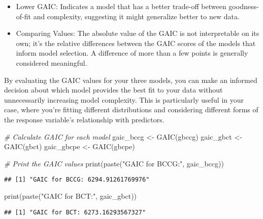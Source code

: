 \documentclass[
]{article}
\newenvironment{Shaded}{\begin{snugshade}}{\end{snugshade}}
\newcommand{\CommentTok}[1]{\textcolor[rgb]{0.56,0.35,0.01}{\textit{#1}}}
\newcommand{\FunctionTok}[1]{\textcolor[rgb]{0.00,0.00,0.00}{#1}}
\newcommand{\NormalTok}[1]{#1}
\newcommand{\OtherTok}[1]{\textcolor[rgb]{0.56,0.35,0.01}{#1}}
\newcommand{\StringTok}[1]{\textcolor[rgb]{0.31,0.60,0.02}{#1}}
\begin{document}
\begin{itemize}
\item
  Lower GAIC: Indicates a model that has a better trade-off between
  goodness-of-fit and complexity, suggesting it might generalize better
  to new data.
\item
  Comparing Values: The absolute value of the GAIC is not interpretable
  on its own; it's the relative differences between the GAIC scores of
  the models that inform model selection. A difference of more than a
  few points is generally considered meaningful.
\end{itemize}

By evaluating the GAIC values for your three models, you can make an
informed decision about which model provides the best fit to your data
without unnecessarily increasing model complexity. This is particularly
useful in your case, where you're fitting different distributions and
considering different forms of the response variable's relationship with
predictors.

\begin{Shaded}
\begin{Highlighting}[]
\CommentTok{\# Calculate GAIC for each model}
\NormalTok{gaic\_bccg }\OtherTok{\textless{}{-}} \FunctionTok{GAIC}\NormalTok{(gbccg)}
\NormalTok{gaic\_gbct }\OtherTok{\textless{}{-}} \FunctionTok{GAIC}\NormalTok{(gbct)}
\NormalTok{gaic\_gbcpe }\OtherTok{\textless{}{-}} \FunctionTok{GAIC}\NormalTok{(gbcpe)}

\CommentTok{\# Print the GAIC values}
\FunctionTok{print}\NormalTok{(}\FunctionTok{paste}\NormalTok{(}\StringTok{"GAIC for BCCG:"}\NormalTok{, gaic\_bccg))}
\end{Highlighting}
\end{Shaded}

\begin{verbatim}
## [1] "GAIC for BCCG: 6294.91261769976"
\end{verbatim}

\begin{Shaded}
\begin{Highlighting}[]
\FunctionTok{print}\NormalTok{(}\FunctionTok{paste}\NormalTok{(}\StringTok{"GAIC for BCT:"}\NormalTok{, gaic\_gbct))}
\end{Highlighting}
\end{Shaded}

\begin{verbatim}
## [1] "GAIC for BCT: 6273.16293567327"
\end{verbatim}
\end{document}
